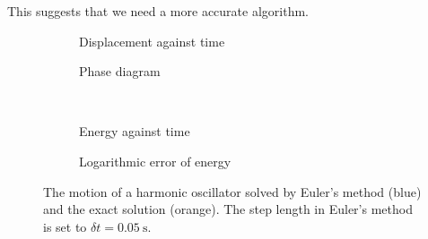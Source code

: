 \documentclass{article}
\theoremstyle{plain}\theoremheaderfont{\normalfont\itshape}\theorembodyfont{\rmfamily}\theoremseparator{.}\newtheorem*{rem}{Remark}\newtheorem*{ex}{Example}\newtheorem*{proof}{Proof}\newtheorem*{altp}{Alternative proof}
\theoremstyle{plain}\theoremheaderfont{\normalfont\bfseries}\theorembodyfont{\rmfamily}\theoremseparator{.}\newtheorem{thm}{Theorem}[section]\newtheorem{lem}[thm]{Lemma}\newtheorem{prop}[thm]{Proposition}\newtheorem*{cor}{Corollary}\newtheorem{defn}[thm]{Definition}\newtheorem{clm}[thm]{Claim}\newtheorem{clminproof}{Claim}\newtheorem{alg}[thm]{Algorithm}\newtheorem{hyp}[thm]{Hypothesis}\newtheorem{law}[thm]{Law}
\theoremstyle{break}\theoremheaderfont{\normalfont\itshape}\theorembodyfont{\rmfamily}\theoremseparator{.\medskip}\newtheorem*{proofskip}{Proof}\newtheorem*{exs}{Examples}\newtheorem*{rems}{Remarks}
\theoremstyle{break}\theoremheaderfont{\normalfont\bfseries}\theorembodyfont{\rmfamily}\theoremseparator{.\medskip}\newtheorem{lemskip}[thm]{Lemma}\newtheorem{defnskip}[thm]{Definition}\newtheorem{propskip}[thm]{Proposition}\newtheorem{thmskip}[thm]{Theorem}
\numberwithin{equation}{section}
\newcommand{\unit}[1]{\ \mathrm{#1}}
\begin{document}
    This suggests that we need a more accurate algorithm.

    \begin{figure}[ht!]
        \begin{subfigure}[h]{0.48\linewidth}
            \begin{adjustbox}{width=\linewidth}
            
            \end{adjustbox}
            \caption{Displacement against time}
        \end{subfigure}
        \hfill
        \begin{subfigure}[h]{0.48\linewidth}
            \begin{adjustbox}{width=\linewidth}
            
            \end{adjustbox}
            \caption{Phase diagram}
        \end{subfigure}\\
        \vskip 0.5cm
        \begin{subfigure}[h]{0.48\linewidth}
            \begin{adjustbox}{width=\linewidth}
            
            \end{adjustbox}
            \caption{Energy against time}
        \end{subfigure}
        \hfill
        \begin{subfigure}[h]{0.48\linewidth}
            \begin{adjustbox}{width=\linewidth}
            
            \end{adjustbox}
            \caption{Logarithmic error of energy}
        \end{subfigure}%
        \caption{The motion of a harmonic oscillator solved by Euler's method (blue) and the exact solution (orange). The step length in Euler's method is set to \(\delta t=0.05\unit{s}\).}
        \label{Fig:Euler}
    \end{figure}
\end{document}
